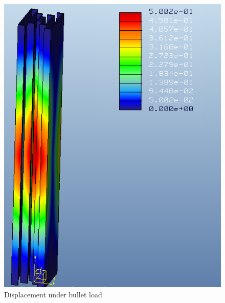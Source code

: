 \documentclass[12pt,letterpaper]{report}
\begin{document}
		\begin{figure}[H]
			\centering
			\includegraphics[width=.5\textwidth]{BulletAssyDisp}
			\caption{Displacement under bullet load}
			\label{fig:BulletDisp}
		\end{figure}
		\graphicspath{ {..} }
		
\end{document}
